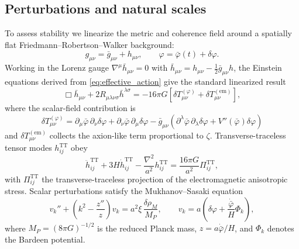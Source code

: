 \documentclass[12pt,a4paper]{article}
\theoremstyle{definition}
\begin{document}
\subsection{Perturbations and natural scales}

To assess stability we linearize the metric and coherence field around a spatially flat Friedmann--Robertson--Walker background:
\begin{equation}
g_{\mu\nu} = \bar{g}_{\mu\nu} + h_{\mu\nu}, \qquad \varphi = \bar{\varphi}(t) + \delta\varphi.
\end{equation}
Working in the Lorenz gauge $\nabla^\mu \bar{h}_{\mu\nu} = 0$ with $\bar{h}_{\mu\nu} = h_{\mu\nu} - \frac{1}{2} \bar{g}_{\mu\nu} h$, the Einstein equations derived from \eqref{eq:effective_action} give the standard linearized result\cite{Mukhanov2005}
\begin{equation}
\Box \bar{h}_{\mu\nu} + 2 R_{\mu\lambda\nu\sigma} \bar{h}^{\lambda\sigma} = -16\pi G \left[\delta T_{\mu\nu}^{(\varphi)} + \delta T_{\mu\nu}^{(\text{em})} \right],
\end{equation}
where the scalar-field contribution is
\begin{equation}
\delta T_{\mu\nu}^{(\varphi)} = \partial_\mu \bar{\varphi} \, \partial_\nu \delta\varphi + \partial_\nu \bar{\varphi} \, \partial_\mu \delta\varphi - \bar{g}_{\mu\nu} \left(\partial^\lambda \bar{\varphi} \, \partial_\lambda \delta\varphi + V''(\bar{\varphi}) \delta\varphi \right)
\end{equation}
and $\delta T_{\mu\nu}^{(\text{em})}$ collects the axion-like term proportional to $\zeta$. Transverse-traceless tensor modes $h_{ij}^{\text{TT}}$ obey
\begin{equation}
\ddot{h}_{ij}^{\text{TT}} + 3H \dot{h}_{ij}^{\text{TT}} - \frac{\nabla^2}{a^2} h_{ij}^{\text{TT}} = \frac{16\pi G}{a^2} \Pi_{ij}^{\text{TT}},
\end{equation}
with $\Pi_{ij}^{\text{TT}}$ the transverse-traceless projection of the electromagnetic anisotropic stress. Scalar perturbations satisfy the Mukhanov--Sasaki equation
\begin{equation}
v_k'' + \left(k^2 - \frac{z''}{z}\right) v_k = a^2 \xi \, \frac{\delta \rho_M}{M_P}, \qquad v_k = a \left(\delta\varphi + \frac{\dot{\bar{\varphi}}}{H} \Phi_k \right),
\end{equation}
where $M_P = (8\pi G)^{-1/2}$ is the reduced Planck mass, $z = a \dot{\bar{\varphi}}/H$, and $\Phi_k$ denotes the Bardeen potential.
\end{document}
